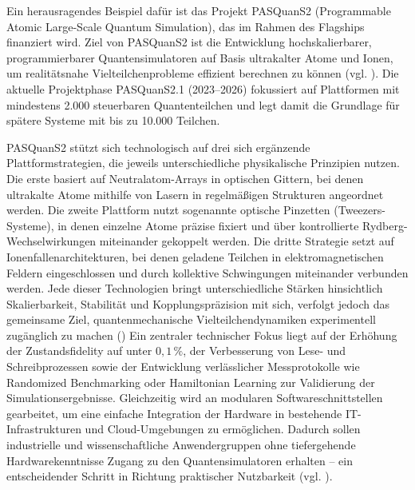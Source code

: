 \vspace{0.5em}

Ein herausragendes Beispiel dafür ist das Projekt PASQuanS2 (Programmable Atomic Large-Scale Quantum Simulation), das im Rahmen des Flagships finanziert wird. Ziel von PASQuanS2 ist die Entwicklung hochskalierbarer, programmierbarer Quantensimulatoren auf Basis ultrakalter Atome und Ionen, um realitätsnahe Vielteilchenprobleme effizient berechnen zu können (vgl. \cite{rasanenPathEuropeanQuantum2021}). Die aktuelle Projektphase PASQuanS2.1 (2023–2026) fokussiert auf Plattformen mit mindestens 2.000 steuerbaren Quantenteilchen und legt damit die Grundlage für spätere Systeme mit bis zu 10.000 Teilchen. 

\vspace{0.5em}

PASQuanS2 stützt sich technologisch auf drei sich ergänzende Plattformstrategien, die jeweils unterschiedliche physikalische Prinzipien nutzen. Die erste basiert auf Neutralatom-Arrays in optischen Gittern, bei denen ultrakalte Atome mithilfe von Lasern in regelmäßigen Strukturen angeordnet werden. Die zweite Plattform nutzt sogenannte optische Pinzetten (Tweezers-Systeme), in denen einzelne Atome präzise fixiert und über kontrollierte Rydberg-Wechselwirkungen miteinander gekoppelt werden. Die dritte Strategie setzt auf Ionenfallenarchitekturen, bei denen geladene Teilchen in elektromagnetischen Feldern eingeschlossen und durch kollektive Schwingungen miteinander verbunden werden. Jede dieser Technologien bringt unterschiedliche Stärken hinsichtlich Skalierbarkeit, Stabilität und Kopplungspräzision mit sich, verfolgt jedoch das gemeinsame Ziel, quantenmechanische Vielteilchendynamiken experimentell zugänglich zu machen (\cite{scherer_pasquans2_nodate}) Ein zentraler technischer Fokus liegt auf der Erhöhung der Zustandsfidelity auf unter \(0{,}1\,\%\), der Verbesserung von Lese- und Schreibprozessen sowie der Entwicklung verlässlicher Messprotokolle wie Randomized Benchmarking oder Hamiltonian Learning zur Validierung der Simulationsergebnisse. Gleichzeitig wird an modularen Softwareschnittstellen gearbeitet, um eine einfache Integration der Hardware in bestehende IT-Infrastrukturen und Cloud-Umgebungen zu ermöglichen. Dadurch sollen industrielle und wissenschaftliche Anwendergruppen ohne tiefergehende Hardwarekenntnisse Zugang zu den Quantensimulatoren erhalten – ein entscheidender Schritt in Richtung praktischer Nutzbarkeit (vgl. \cite{rasanenPathEuropeanQuantum2021}).

\vspace{0.5em}

